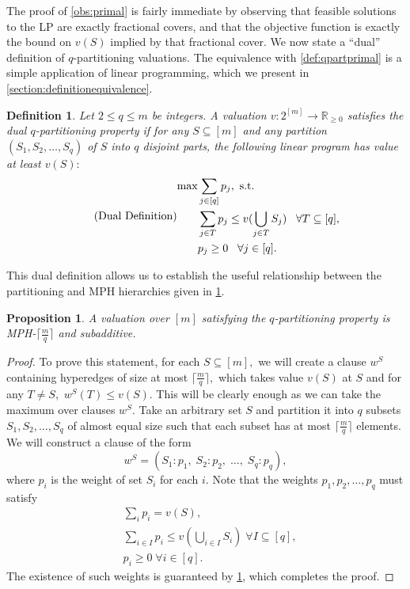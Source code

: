 \documentclass[11pt]{article}\usepackage{amsfonts}
\newtheorem{definition}[theorem]{Definition}
\newtheorem{proposition}[theorem]{Proposition}
\numberwithin{theorem}{subsection}
\begin{document}
The proof of \cref{obs:primal} is fairly immediate by observing that feasible solutions to the LP are exactly fractional covers, and that the objective function is exactly the bound on $v(S)$ implied by that fractional cover. We now state a ``dual'' definition of $q$-partitioning valuations. The equivalence with \cref{def:qpartprimal} is a simple application of linear programming, which we present in \cref{section:definitionequivalence}.

\begin{definition}
\label{def:qpartdual}
Let $2\le q \le m$ be integers. A valuation $v:2^{[m]}\longrightarrow \mathbb{R}_{\ge 0}$ satisfies the dual $q$-partitioning property if for any $S\subseteq [m]$ and any partition $(S_1, S_2, \ldots, S_q)$ of $S$ into $q$ disjoint parts, the following linear program has value at least $v(S):$
\begin{equation}
\tag{\text{Dual Definition}}
\label{eq:qpartdualLP}
    \begin{split}
        \max &\sum_{j \in [q]} p_j, \text{ s.t.}\\
        & \sum_{j \in T} p_j\le v(\bigcup_{j \in T} S_j) \; \; \; \forall T\subseteq [q],\\
        &p_j\ge 0 \; \; \; \forall j\in [q].
    \end{split}
\end{equation}
\end{definition}

\noindent
This dual definition allows us to establish the useful relationship between the partitioning and MPH hierarchies given in \cref{lem:qpartandmphk}.


\begin{proposition}
\label{lem:qpartandmphk}
A valuation over $[m]$ satisfying the $q$-partitioning property is MPH-$\lceil \frac{m}{q}\rceil$ and subadditive.\end{proposition}

\begin{proof}
To prove this statement, for each $S\subseteq [m],$ we will create a clause $w^S$ containing hyperedges of size at most $\lceil \frac{m}{q}\rceil,$ which takes value $v(S)$ at $S$ and for any $T\neq S,$ $w^S(T)\le v(S).$ This will be clearly enough as we can take the maximum over clauses $w^S.$
Take an arbitrary set $S$ and partition it into $q$ subsets $S_1,S_2, \ldots, S_q$ of almost equal size such that each subset has at most $\lceil \frac{m}{q}\rceil$ elements.  We will construct a clause of the form
$$
w^S = (S_1: p_1, \; S_2 : p_2,\;  \ldots, \; S_q:p_q ),
$$
where $p_i$ is the weight of set $S_i$ for each $i.$ Note that the weights $p_1, p_2, \ldots, p_q$ must satisfy
\begin{equation*}
    \begin{split}
        & \sum_i p_i = v(S),\\
        & \sum_{i \in I} p_i \le v(\bigcup_{i \in I}S_i)\; \forall
I\subseteq [q],\\
    & p_i\ge 0\; \forall i\in [q].
    \end{split}
\end{equation*}
The existence of such weights is guaranteed by \cref{def:qpartdual}, which completes the proof.\end{proof}
\end{document}
